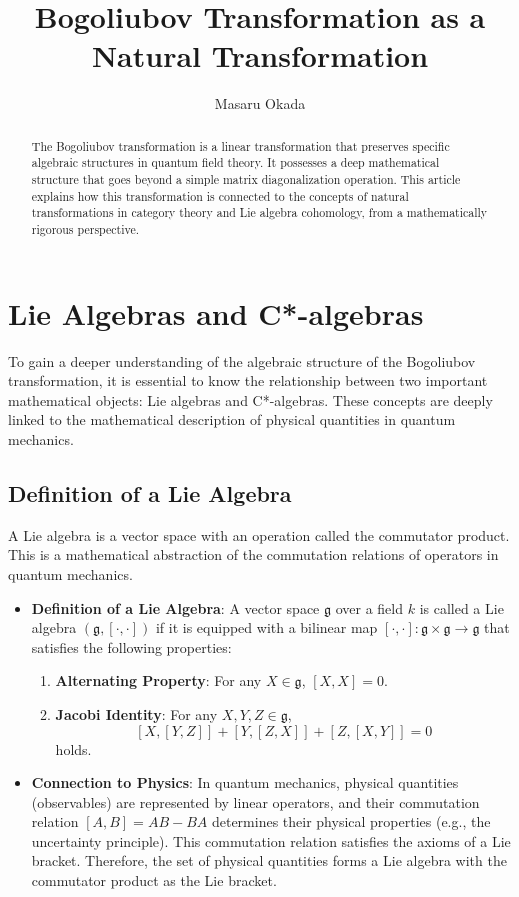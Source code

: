 \documentclass[uplatex,a4j,12pt,dvipdfmx]{article}
\title{
\hspace{2.8em} Bogoliubov Transformation \newline as a Natural Transformation
}
\author{
Masaru Okada
}
\begin{document}
\maketitle

\begin{abstract}
    The Bogoliubov transformation is a linear transformation that preserves specific algebraic structures in quantum field theory. It possesses a deep mathematical structure that goes beyond a simple matrix diagonalization operation. This article explains how this transformation is connected to the concepts of natural transformations in category theory and Lie algebra cohomology, from a mathematically rigorous perspective.
\end{abstract}


\section{Lie Algebras and C*-algebras}

To gain a deeper understanding of the algebraic structure of the Bogoliubov transformation, it is essential to know the relationship between two important mathematical objects: Lie algebras and C*-algebras. These concepts are deeply linked to the mathematical description of physical quantities in quantum mechanics.

\subsection{Definition of a Lie Algebra}

A Lie algebra is a vector space with an operation called the commutator product. This is a mathematical abstraction of the commutation relations of operators in quantum mechanics.

\begin{itemize}
    \item \textbf{Definition of a Lie Algebra}:
    A vector space $\mathfrak{g}$ over a field $k$ is called a Lie algebra $(\mathfrak{g}, [\cdot, \cdot])$ if it is equipped with a bilinear map $[\cdot, \cdot]: \mathfrak{g} \times \mathfrak{g} \to \mathfrak{g}$ that satisfies the following properties:
    \begin{enumerate}
        \item \textbf{Alternating Property}: For any $X \in \mathfrak{g}$, $[X, X] = 0$.
        \item \textbf{Jacobi Identity}: For any $X, Y, Z \in \mathfrak{g}$,
        \[
            [X, [Y, Z]] + [Y, [Z, X]] + [Z, [X, Y]] = 0
        \]
        holds.
    \end{enumerate}
    \item \textbf{Connection to Physics}:
    In quantum mechanics, physical quantities (observables) are represented by linear operators, and their commutation relation $[A, B] = AB - BA$ determines their physical properties (e.g., the uncertainty principle). This commutation relation satisfies the axioms of a Lie bracket. Therefore, the set of physical quantities forms a Lie algebra with the commutator product as the Lie bracket.
\end{itemize}
\end{document}
